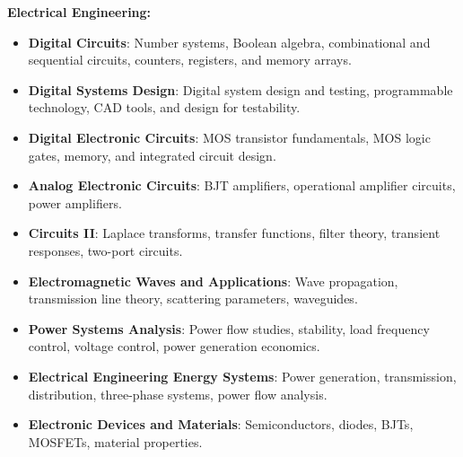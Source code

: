 \documentclass[A4,10pt]{article}
\begin{document}
\begin{itemize}[leftmargin=0.05in, label={}]
    \small{
    \item \textbf{Electrical Engineering:}\\
    \begin{itemize}[leftmargin=0.15in, label={}]
        \item \textbf{Digital Circuits}{: Number systems, Boolean algebra, combinational and sequential circuits, counters, registers, and memory arrays.}\\
        \item \textbf{Digital Systems Design}{: Digital system design and testing, programmable technology, CAD tools, and design for testability.}\\
        \item \textbf{Digital Electronic Circuits}{: MOS transistor fundamentals, MOS logic gates, memory, and integrated circuit design.}\\
        \item \textbf{Analog Electronic Circuits}{: BJT amplifiers, operational amplifier circuits, power amplifiers.}\\
        \item \textbf{Circuits II}{: Laplace transforms, transfer functions, filter theory, transient responses, two-port circuits.}\\
        \item \textbf{Electromagnetic Waves and Applications}{: Wave propagation, transmission line theory, scattering parameters, waveguides.}\\
        \item \textbf{Power Systems Analysis}{: Power flow studies, stability, load frequency control, voltage control, power generation economics.}\\
        \item \textbf{Electrical Engineering Energy Systems}{: Power generation, transmission, distribution, three-phase systems, power flow analysis.}\\
        \item \textbf{Electronic Devices and Materials}{: Semiconductors, diodes, BJTs, MOSFETs, material properties.}\\
    \end{itemize}
    
}
\end{itemize}
\end{document}
